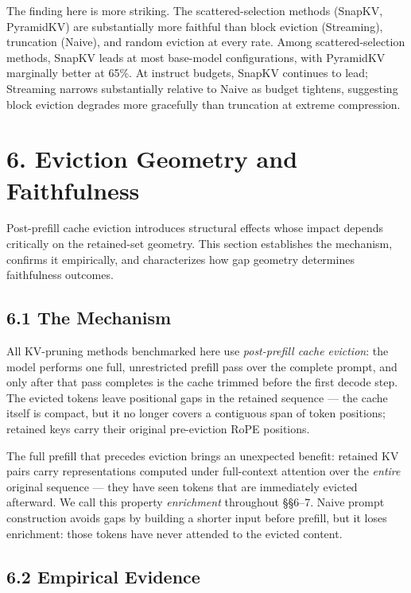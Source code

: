 \documentclass[10pt,letterpaper]{article}
\begin{document}
The finding here is more striking.
The scattered-selection methods (SnapKV, PyramidKV) are substantially more faithful than
block eviction (Streaming), truncation (Naive), and random eviction
at every rate. Among scattered-selection methods, SnapKV leads at most base-model
configurations, with PyramidKV marginally better at 65\%.
At instruct budgets, SnapKV continues to lead; Streaming
narrows substantially relative to Naive as budget tightens, suggesting
block eviction degrades more gracefully than truncation at extreme
compression.


\hypertarget{eviction-geometry-and-faithfulness}{%
\section{6. Eviction Geometry and Faithfulness}\label{eviction-geometry-and-faithfulness}}

Post-prefill cache eviction introduces structural effects whose impact depends critically
on the retained-set geometry. This section establishes the mechanism, confirms it
empirically, and characterizes how gap geometry determines faithfulness outcomes.

\hypertarget{the-mechanism}{%
\subsection{6.1 The Mechanism}\label{the-mechanism}}

All KV-pruning methods benchmarked here use \emph{post-prefill cache
eviction}: the model performs one full, unrestricted prefill pass over
the complete prompt, and only after that pass completes is the cache
trimmed before the first decode step. The evicted tokens leave positional gaps in the retained sequence ---
the cache itself is compact, but it no longer covers a contiguous span
of token positions; retained keys carry their original pre-eviction
RoPE positions.

The full prefill that precedes eviction brings an unexpected benefit:
retained KV pairs carry representations computed under full-context
attention over the \emph{entire} original sequence --- they have seen
tokens that are immediately evicted afterward. We call this property \emph{enrichment}
throughout §§6--7. Naive prompt construction avoids gaps by building a
shorter input before prefill, but it loses enrichment: those tokens
have never attended to the evicted content.

\hypertarget{empirical-evidence}{%
\subsection{6.2 Empirical Evidence}\label{empirical-evidence}}
\end{document}
